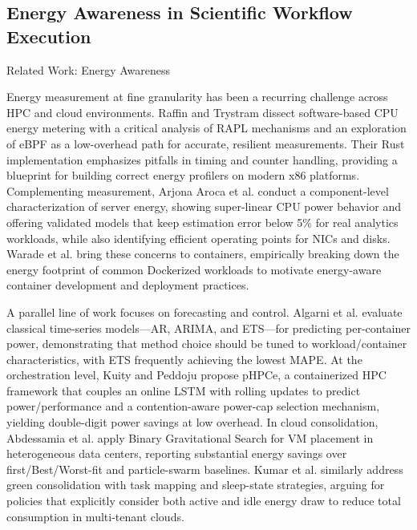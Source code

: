 \subsection{Energy Awareness in Scientific Workflow Execution}
\label{sec:relatedwork_energy_awareness_scientific_workflow_execution}
Related Work: Energy Awareness

Energy measurement at fine granularity has been a recurring challenge across HPC and cloud environments. Raffin and Trystram dissect software-based CPU energy metering with a critical analysis of RAPL mechanisms and an exploration of eBPF as a low-overhead path for accurate, resilient measurements. Their Rust implementation emphasizes pitfalls in timing and counter handling, providing a blueprint for building correct energy profilers on modern x86 platforms. Complementing measurement, Arjona Aroca et al. conduct a component-level characterization of server energy, showing super-linear CPU power behavior and offering validated models that keep estimation error below 5\% for real analytics workloads, while also identifying efficient operating points for NICs and disks. Warade et al. bring these concerns to containers, empirically breaking down the energy footprint of common Dockerized workloads to motivate energy-aware container development and deployment practices.

A parallel line of work focuses on forecasting and control. Algarni et al. evaluate classical time-series models—AR, ARIMA, and ETS—for predicting per-container power, demonstrating that method choice should be tuned to workload/container characteristics, with ETS frequently achieving the lowest MAPE. At the orchestration level, Kuity and Peddoju propose pHPCe, a containerized HPC framework that couples an online LSTM with rolling updates to predict power/performance and a contention-aware power-cap selection mechanism, yielding double-digit power savings at low overhead. In cloud consolidation, Abdessamia et al. apply Binary Gravitational Search for VM placement in heterogeneous data centers, reporting substantial energy savings over first/Best/Worst-fit and particle-swarm baselines. Kumar et al. similarly address green consolidation with task mapping and sleep-state strategies, arguing for policies that explicitly consider both active and idle energy draw to reduce total consumption in multi-tenant clouds.

